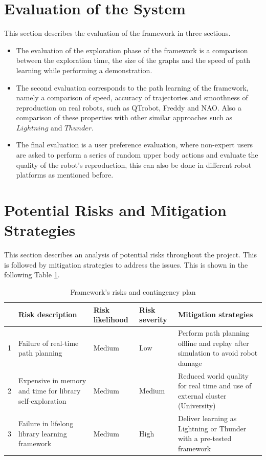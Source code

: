 \documentclass[thesis]{mas_proposal}
\begin{document}
\section{Evaluation of the System}

	This section describes the evaluation of the framework in three sections. 
	
	\begin{itemize}
		
		\item The evaluation of the exploration phase of the framework is a comparison between the exploration time, the size of the graphs and the speed of path learning while performing a demonstration.
		
		\item The second evaluation corresponds to the path learning of the framework, namely a comparison of speed, accuracy of trajectories and smoothness of reproduction on real robots, such as QTrobot, Freddy and NAO.
		Also a comparison of these properties with other similar approaches such as $Lightning$ and $Thunder$. 
		
		\item The final evaluation is a user preference evaluation, where non-expert users are asked to perform a series of random upper body actions and evaluate the quality of the robot's reproduction, this can also be done in different robot platforms as mentioned before.
	
	\end{itemize}

\section{Potential Risks and Mitigation Strategies}

	This section describes an analysis of potential risks throughout the project. This is followed by mitigation strategies to address the issues. This is shown in the following Table \ref{table:risks_and_mitigation}.
	
	\begin{table}[h]
		\begin{tabular}{|p{0.3cm}|p{3.2cm}|p{2.6cm}|p{2.6cm}|p{3.9cm}|}
			\rowcolor{Gray}
			\hline
			& Risk description & Risk likelihood & Risk severity & Mitigation strategies\\
			\hline 
			1 & Failure of real-time path planning & Medium & Low & Perform path planning offline and replay after simulation to avoid robot damage \\
			\hline
			2 & Expensive in memory and time for library self-exploration & Medium & Medium & Reduced world quality for real time and use of external cluster (University) \\
			\hline
			3 & Failure in lifelong library learning framework & Medium & High & Deliver learning as Lightning or Thunder with a pre-tested framework \\
			\hline
		\end{tabular}
	\caption{Framework's risks and contingency plan}	
	\label{table:risks_and_mitigation}
	\end{table}
	
\end{document}
